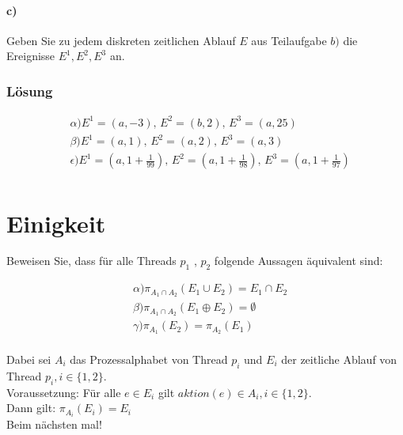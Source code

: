 \documentclass[a4paper]{scrartcl}
\begin{document}
\paragraph{c)} Geben Sie zu jedem diskreten zeitlichen Ablauf $ E $ aus Teilaufgabe $ b) $ die Ereignisse $E^1, E^2, E^3 $ an.

\subsubsection*{Lösung}
\begin{align*}
& \alpha ) E^1 = (a, -3) \text{, } E^2 = (b, 2) \text{, } E^3 = (a, 25) \\
& \beta ) E^1 = (a, 1) \text{, } E^2 = (a, 2) \text{, } E^3 = (a, 3) \\
& \epsilon ) E^1 = (a, 1 + \frac{1}{99}) \text{, } E^2 = (a, 1 + \frac{1}{98}) \text{, } E^3 = (a, 1 + \frac{1}{97}) \\
\end{align*}


\section{Einigkeit}
Beweisen Sie, dass für alle Threads $ p_1 $ , $ p_2 $ folgende Aussagen äquivalent sind:

\begin{align*}
& \alpha ) \pi_{A_1 \cap A_2} (E_1 \cup E_2) = E_1 \cap E_2\\
& \beta ) \pi_{A_1 \cap A_2} (E_1 \oplus E_2) = \emptyset\\
& \gamma ) \pi_{A_1} (E_2) = \pi_{A_2} (E_1) \\
\end{align*}



Dabei sei $ A_i $ das Prozessalphabet von Thread $ p_i $ und $ E_i $ der zeitliche Ablauf von Thread $ p_i , i \in \{1,2\}$.\\
Voraussetzung: Für alle $ e \in E_i $ gilt $aktion(e) \in A_i, i \in \{1,2\}$.\\
Dann gilt: $ \pi_{A_i}(E_i) = E_i$
\\
Beim nächsten mal!
\end{document}
